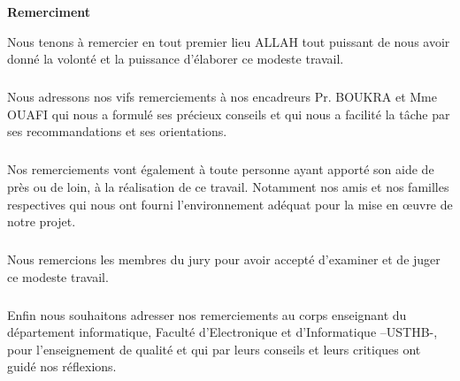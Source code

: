 
\thispagestyle{empty}

\begin{center}
	\Large\textbf{Remerciment}
\end{center}

\large{Nous tenons à remercier en tout premier lieu ALLAH tout  puissant de nous avoir donné la volonté et la puissance d’élaborer ce modeste travail.
\subparagraph{}
Nous adressons nos vifs remerciements à nos encadreurs Pr. BOUKRA et Mme OUAFI qui nous a formulé ses précieux conseils et qui nous a  facilité la tâche par ses recommandations et ses  orientations.
\subparagraph{}
Nos remerciements vont également à toute personne ayant apporté son aide de près ou de loin, à la réalisation de ce travail. Notamment nos amis et nos familles respectives qui nous ont fourni l'environnement adéquat pour la mise en œuvre de notre projet.
\subparagraph{}
Nous remercions les membres du jury pour avoir accepté d’examiner et de juger ce modeste travail.
\subparagraph{}
Enfin nous souhaitons adresser nos remerciements au corps enseignant du département informatique, Faculté d'Electronique et d'Informatique –USTHB-, pour l'enseignement de qualité et qui par leurs conseils et leurs critiques ont guidé nos réflexions.}